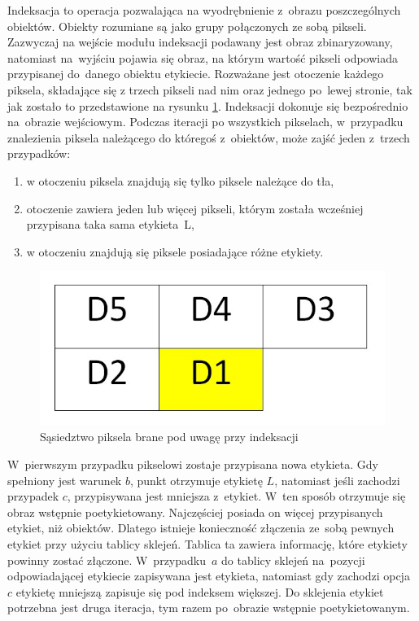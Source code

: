 Indeksacja to operacja pozwalająca na wyodrębnienie z~obrazu poszczególnych obiektów. 
Obiekty rozumiane są jako grupy połączonych ze sobą pikseli. 
Zazwyczaj na wejście modułu indeksacji podawany jest obraz zbinaryzowany, natomiast na~wyjściu pojawia się obraz, na którym  wartość  pikseli odpowiada przypisanej do~danego obiektu etykiecie. 
Rozważane jest otoczenie każdego piksela, składające się z trzech pikseli nad nim oraz jednego po~lewej stronie, tak jak zostało to przedstawione na rysunku \ref{fig:ind_sasiedztwo}. 
Indeksacji dokonuje się bezpośrednio na~obrazie wejściowym. 
Podczas iteracji po wszystkich pikselach, w~przypadku znalezienia piksela należącego do któregoś z~obiektów, może zajść jeden z~trzech przypadków:
\begin{enumerate}[label=(\alph*)]
	\item w otoczeniu piksela znajdują się tylko piksele należące do tła,
	\item otoczenie zawiera jeden lub więcej pikseli, którym została wcześniej przypisana taka sama etykieta~L,
	\item w otoczeniu znajdują się piksele posiadające różne etykiety.
\end{enumerate} 
\begin{figure}[h]
	\centering
	\includegraphics[width=\textwidth]{ind_sasiedztwo.jpg}
	\caption{Sąsiedztwo piksela brane pod uwagę przy indeksacji}
	\label{fig:ind_sasiedztwo}
\end{figure}

W~pierwszym przypadku pikselowi zostaje przypisana nowa etykieta. 
Gdy spełniony jest warunek $b$, punkt otrzymuje etykietę $L$, natomiast jeśli zachodzi przypadek $c$, przypisywana jest mniejsza z~etykiet. 
W~ten sposób otrzymuje się obraz wstępnie poetykietowany. 
Najczęściej posiada on więcej przypisanych etykiet, niż obiektów. 
Dlatego istnieje konieczność złączenia ze~sobą pewnych etykiet przy użyciu tablicy sklejeń. 
Tablica ta zawiera informację, które etykiety powinny zostać złączone. 
W~przypadku~$a$ do tablicy sklejeń na~pozycji odpowiadającej etykiecie zapisywana jest etykieta, natomiast gdy zachodzi opcja~$c$ etykietę mniejszą zapisuje się pod indeksem większej. 
Do sklejenia etykiet potrzebna jest druga iteracja, tym razem po~obrazie wstępnie poetykietowanym.\\

